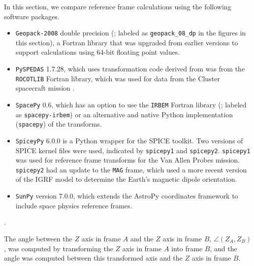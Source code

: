 \documentclass[draft]{agujournal2019}
\begin{document}
In this section, we compare reference frame calculations using the following software packages. 

\begin{itemize}
    \item \texttt{Geopack-2008} double precision (; labeled as \texttt{geopack\_08\_dp} in the figures in this section), a Fortran library that was upgraded from earlier versions to support calculations using 64-bit floating point values.
    \item \texttt{PySPEDAS} 1.7.28, which uses transformation code derived from  \cite{Angelopoulos2024IDL} was from the \texttt{ROCOTLIB} Fortran \cite{ROCOTLIB} library, which was used for data from the Cluster spacecraft mission \cite{ClusterTools1993}.
    \item \texttt{SpacePy} 0.6, which has an option to use the \texttt{IRBEM} Fortran library (; labeled as \texttt{spacepy-irbem}) or an alternative and native Python implementation (\texttt{spacepy}) of the transforms.
    \item \texttt{SpiceyPy} 6.0.0 is a Python wrapper for the SPICE toolkit. Two versions of SPICE kernel files were used, indicated by \texttt{spicepy1} and \texttt{spicepy2}. \texttt{spicepy1} was used for reference frame transforms for the Van Allen Probes mission. \texttt{spicepy2} had an update to the \texttt{MAG} frame, which used a more recent version of the IGRF model \cite{Alken2021} to determine the Earth's magnetic dipole orientation. 
    \item \texttt{SunPy} version 7.0.0, which extends the AstroPy coordinates framework to include space physics reference frames.
\end{itemize}

 . 

The angle between the $Z$ axis in frame $A$ and the $Z$ axis in frame $B$, $\angle (Z_A, Z_B)$, was computed by transforming the $Z$ axis in frame $A$ into frame $B$, and the angle was computed between this transformed axis and the $Z$ axis in frame $B$. 
\end{document}
